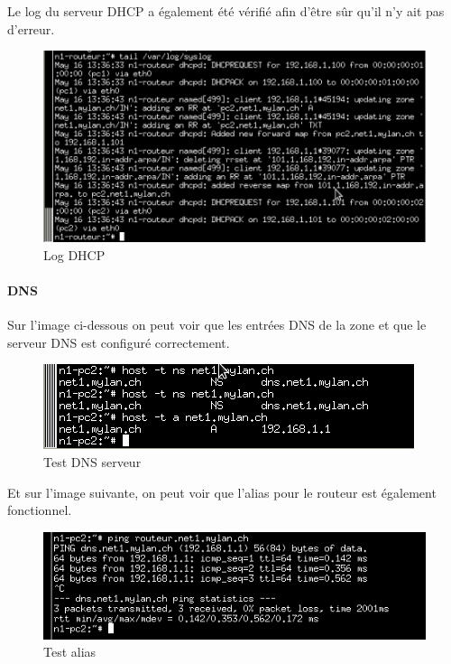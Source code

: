 \documentclass{article}
\begin{document}
Le log du serveur DHCP a également été vérifié afin d'être sûr qu'il n'y ait pas d'erreur.

\begin{figure}[!h]
	\centering
	\includegraphics{./captures/2-log-dhcp.png}
	\caption{Log DHCP}
	\label{fig:Log DHCP}
\end{figure}

\paragraph{DNS}

Sur l'image ci-dessous on peut voir que les entrées DNS de la zone et que le serveur DNS est configuré correctement.

\begin{figure}[!h]
	\centering
	\includegraphics{./captures/1-testrouteur-dns1-pc2.png}
	\caption{Test DNS serveur}
	\label{fig:Test DNS serveur}
\end{figure}

Et sur l'image suivante, on peut voir que l'alias pour le routeur est également fonctionnel.

\begin{figure}[!h]
	\centering
	\includegraphics{./captures/alias-routeur.png}
	\caption{Test alias}
	\label{fig:Test alias}
\end{figure}
\end{document}
